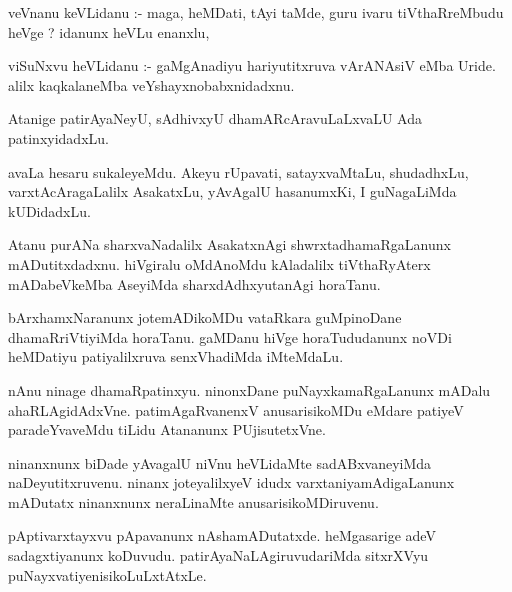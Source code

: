 \documentclass{article}
\begin{document}


\begin{mn}
veVnanu keVLidanu :- maga, heMDati, tAyi taMde, guru ivaru tiVthaRreMbudu heVge ?  idanunx heVLu enanxlu,
\end{mn}

\begin{mn}
viSuNxvu heVLidanu :- gaMgAnadiyu hariyutitxruva vArANAsiV  eMba Uride.  alilx kaqkalaneMba  veYshayxnobabxnidadxnu.
\end{mn}

\begin{mn}
Atanige patirAyaNeyU, sAdhivxyU  dhamARcAravuLaLxvaLU Ada patinxyidadxLu.
\end{mn}

\begin{mn}
avaLa hesaru sukaleyeMdu.  Akeyu rUpavati, satayxvaMtaLu, shudadhxLu, 
varxtAcAragaLalilx AsakatxLu, yAvAgalU hasanumxKi,  I guNagaLiMda kUDidadxLu.
\end{mn}

\begin{mn}
Atanu purANa sharxvaNadalilx AsakatxnAgi shwrxtadhamaRgaLanunx mADutitxdadxnu.  hiVgiralu  
oMdAnoMdu kAladalilx tiVthaRyAterx  mADabeVkeMba AseyiMda sharxdAdhxyutanAgi horaTanu.
\end{mn}

\begin{mn}
bArxhamxNaranunx  jotemADikoMDu  vataRkara guMpinoDane  dhamaRriVtiyiMda horaTanu. 
gaMDanu hiVge horaTududanunx  noVDi heMDatiyu patiyalilxruva senxVhadiMda iMteMdaLu.
\end{mn}

\begin{mn}
nAnu ninage dhamaRpatinxyu.  ninonxDane puNayxkamaRgaLanunx mADalu ahaRLAgidAdxVne.  
patimAgaRvanenxV  anusarisikoMDu eMdare patiyeV paradeYvaveMdu tiLidu Atananunx PUjisutetxVne.
\end{mn}

\begin{mn}
ninanxnunx biDade yAvagalU niVnu heVLidaMte sadABxvaneyiMda naDeyutitxruvenu.  ninanx 
joteyalilxyeV  idudx  varxtaniyamAdigaLanunx mADutatx ninanxnunx neraLinaMte anusarisikoMDiruvenu.
\end{mn}

\begin{mn}
pAptivarxtayxvu pApavanunx nAshamADutatxde.  heMgasarige adeV sadagxtiyanunx 
koDuvudu.  patirAyaNaLAgiruvudariMda sitxrXVyu puNayxvatiyenisikoLuLxtAtxLe.
\end{mn}
\end{document}
